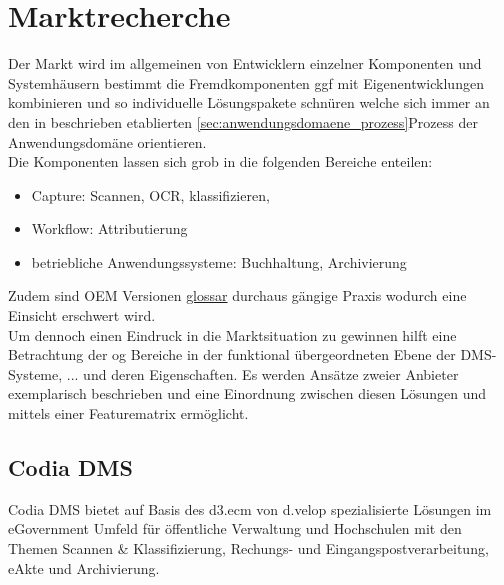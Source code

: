 \chapter{Marktrecherche}

\begin{comment}
Die Marktrecherche, auch related works genannt, beinhaltet die Recherche nach konkurrierenden Systemen, die teilweise oder vollständig die Funktionalitäten aufweisen wie sie für das zu entwickelte System geplant sind. Dabei sollte man Vor- und Nachteile gegenüber dem zu entwickelten System herausstellen. 
\end{comment}

Der Markt wird im allgemeinen von Entwicklern einzelner Komponenten und Systemhäusern bestimmt die Fremdkomponenten ggf mit Eigenentwicklungen kombinieren und so individuelle Lösungspakete schnüren welche sich immer an den in beschrieben etablierten \ref{sec:anwendungsdomaene_prozess}{Prozess} der Anwendungsdomäne orientieren.\\
Die Komponenten lassen sich grob in die folgenden Bereiche enteilen:
\begin{itemize}
\item Capture: Scannen, OCR, klassifizieren, 
\item Workflow: Attributierung
\item betriebliche Anwendungssysteme: Buchhaltung, Archivierung
\end{itemize}
\noindent
Zudem sind OEM Versionen \href{}{glossar} durchaus gängige Praxis wodurch eine Einsicht erschwert wird.\\
Um dennoch einen Eindruck in die Marktsituation zu gewinnen hilft eine Betrachtung der og Bereiche in der funktional übergeordneten Ebene der DMS-Systeme, ... 
%
und deren Eigenschaften. Es werden Ansätze zweier Anbieter exemplarisch beschrieben und eine Einordnung zwischen diesen Lösungen und \brand mittels einer Featurematrix ermöglicht.


\section{Codia DMS }
%
%
Codia DMS bietet auf Basis des d3.ecm von d.velop spezialisierte Lösungen im eGovernment Umfeld für öffentliche Verwaltung und Hochschulen mit den Themen Scannen & Klassifizierung, Rechungs- und Eingangspostverarbeitung, eAkte und Archivierung.



